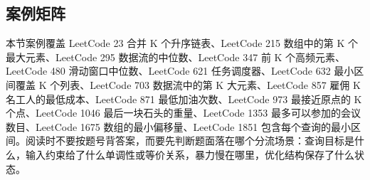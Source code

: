 \subsection{案例矩阵}

本节案例覆盖 LeetCode 23 合并 K 个升序链表、LeetCode 215 数组中的第 K 个最大元素、LeetCode 295 数据流的中位数、LeetCode 347 前 K 个高频元素、LeetCode 480 滑动窗口中位数、LeetCode 621 任务调度器、LeetCode 632 最小区间覆盖 K 个列表、LeetCode 703 数据流中的第 K 大元素、LeetCode 857 雇佣 K 名工人的最低成本、LeetCode 871 最低加油次数、LeetCode 973 最接近原点的 K 个点、LeetCode 1046 最后一块石头的重量、LeetCode 1353 最多可以参加的会议数目、LeetCode 1675 数组的最小偏移量、LeetCode 1851 包含每个查询的最小区间。阅读时不要按题号背答案，而要先判断题面落在哪个分流场景：查询目标是什么，输入约束给了什么单调性或等价关系，暴力慢在哪里，优化结构保存了什么状态。

